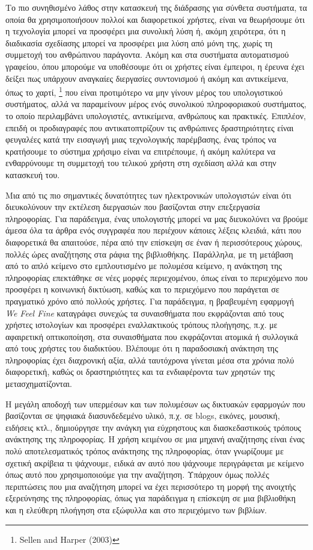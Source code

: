 \documentclass[
]{article}
\begin{document}
Το πιο συνηθισμένο λάθος στην κατασκευή της διάδρασης για σύνθετα
συστήματα, τα οποία θα χρησιμοποιήσουν πολλοί και διαφορετικοί χρήστες,
είναι να θεωρήσουμε ότι η τεχνολογία μπορεί να προσφέρει μια συνολική
λύση ή, ακόμη χειρότερα, ότι η διαδικασία σχεδίασης μπορεί να προσφέρει
μια λύση από μόνη της, χωρίς τη συμμετοχή του ανθρώπινου παράγοντα.
Ακόμη και στα συστήματα αυτοματισμού γραφείου, όπου μπορούμε να
υποθέσουμε ότι οι χρήστες είναι έμπειροι, η έρευνα έχει δείξει πως
υπάρχουν αναγκαίες διεργασίες συντονισμού ή ακόμη και αντικείμενα, όπως
το χαρτί, \footnote{Sellen and Harper (2003)} που είναι προτιμότερο να
μην γίνουν μέρος του υπολογιστικού συστήματος, αλλά να παραμείνουν μέρος
ενός συνολικού πληροφοριακού συστήματος, το οποίο περιλαμβάνει
υπολογιστές, αντικείμενα, ανθρώπους και πρακτικές. Επιπλέον, επειδή οι
προδιαγραφές που αντικατοπτρίζουν τις ανθρώπινες δραστηριότητες είναι
φευγαλέες κατά την εισαγωγή μιας τεχνολογικής παρέμβασης, ένας τρόπος να
κρατήσουμε το σύστημα χρήσιμο είναι να επιτρέπουμε, ή ακόμη καλύτερα να
ενθαρρύνουμε τη συμμετοχή του τελικού χρήστη στη σχεδίαση αλλά και στην
κατασκευή του.

Μια από τις πιο σημαντικές δυνατότητες των ηλεκτρονικών υπολογιστών
είναι ότι διευκολύνουν την εκτέλεση διεργασιών που βασίζονται στην
επεξεργασία πληροφορίας. Για παράδειγμα, ένας υπολογιστής μπορεί να μας
διευκολύνει να βρούμε άμεσα όλα τα άρθρα ενός συγγραφέα που περιέχουν
κάποιες λέξεις κλειδιά, κάτι που διαφορετικά θα απαιτούσε, πέρα από την
επίσκεψη σε έναν ή περισσότερους χώρους, πολλές ώρες αναζήτησης στα
ράφια της βιβλιοθήκης. Παράλληλα, με τη μετάβαση από το απλό κείμενο στο
εμπλουτισμένο με πολυμέσα κείμενο, η ανάκτηση της πληροφορίας επεκτάθηκε
σε νέες μορφές περιεχομένου, όπως είναι το περιεχόμενο που προσφέρει η
κοινωνική δικτύωση, καθώς και το περιεχόμενο που παράγεται σε πραγματικό
χρόνο από πολλούς χρήστες. Για παράδειγμα, η βραβευμένη εφαρμογή
\emph{We Feel Fine} καταγράφει συνεχώς τα συναισθήματα που εκφράζονται
από τους χρήστες ιστολογίων και προσφέρει εναλλακτικούς τρόπους
πλοήγησης, π.χ. με αφαιρετική οπτικοποίηση, στα συναισθήματα που
εκφράζονται ατομικά ή συλλογικά από τους χρήστες του διαδικτύου.
Βλέπουμε ότι η παραδοσιακή ανάκτηση της πληροφορίας έχει διαχρονική
αξία, αλλά ταυτόχρονα γίνεται μέσα στα χρόνια πολύ διαφορετική, καθώς οι
δραστηριότητες και τα ενδιαφέροντα των χρηστών της μετασχηματίζονται.

Η μεγάλη αποδοχή των υπερμέσων και των πολυμέσων ως δικτυακών εφαρμογών
που βασίζονται σε ψηφιακά διασυνδεδεμένο υλικό, π.χ. σε blogs, εικόνες,
μουσική, ειδήσεις κτλ., δημιούργησε την ανάγκη για εύχρηστους και
διασκεδαστικούς τρόπους ανάκτησης της πληροφορίας. Η χρήση κειμένου σε
μια μηχανή αναζήτησης είναι ένας πολύ αποτελεσματικός τρόπος ανάκτησης
της πληροφορίας, όταν γνωρίζουμε με σχετική ακρίβεια τι ψάχνουμε, ειδικά
αν αυτό που ψάχνουμε περιγράφεται με κείμενο όπως αυτό που
χρησιμοποιούμε για την αναζήτηση. Υπάρχουν όμως πολλές περιπτώσεις που
μια αναζήτηση μπορεί να έχει περισσότερο τη μορφή της ανοιχτής
εξερεύνησης της πληροφορίας, όπως για παράδειγμα η επίσκεψη σε μια
βιβλιοθήκη και η ελεύθερη πλοήγηση στα εξώφυλλα και στο περιεχόμενο των
βιβλίων.
\end{document}
